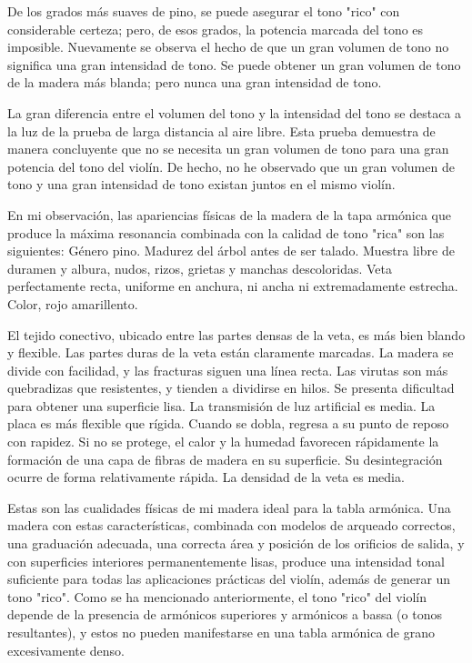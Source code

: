 \documentclass[12pt]{book}
\begin{document}
De los grados más suaves de pino, se puede asegurar el tono "rico" con considerable certeza; pero, de esos grados, la potencia marcada del tono es imposible. Nuevamente se observa el hecho de que un gran volumen de tono no significa una gran intensidad de tono. Se puede obtener un gran volumen de tono de la madera más blanda; pero nunca una gran intensidad de tono.

La gran diferencia entre el volumen del tono y la intensidad del tono se destaca a la luz de la prueba de larga distancia al aire libre. Esta prueba demuestra de manera concluyente que no se necesita un gran volumen de tono para una gran potencia del tono del violín. De hecho, no he observado que un gran volumen de tono y una gran intensidad de tono existan juntos en el mismo violín.

En mi observación, las apariencias físicas de la madera de la tapa armónica que produce la máxima resonancia combinada con la calidad de tono "rica" son las siguientes: Género pino. Madurez del árbol antes de ser talado. Muestra libre de duramen y albura, nudos, rizos, grietas y manchas descoloridas. Veta perfectamente recta, uniforme en anchura, ni ancha ni extremadamente estrecha. Color, rojo amarillento.

El tejido conectivo, ubicado entre las partes densas de la veta, es más bien blando y flexible.  
Las partes duras de la veta están claramente marcadas.  
La madera se divide con facilidad, y las fracturas siguen una línea recta.  
Las virutas son más quebradizas que resistentes, y tienden a dividirse en hilos.  
Se presenta dificultad para obtener una superficie lisa.  
La transmisión de luz artificial es media.  
La placa es más flexible que rígida.  
Cuando se dobla, regresa a su punto de reposo con rapidez.  
Si no se protege, el calor y la humedad favorecen rápidamente la formación de una capa de fibras de madera en su superficie.  
Su desintegración ocurre de forma relativamente rápida.  
La densidad de la veta es media.  

Estas son las cualidades físicas de mi madera ideal para la tabla armónica. Una madera con estas características, combinada con modelos de arqueado correctos, una graduación adecuada, una correcta área y posición de los orificios de salida, y con superficies interiores permanentemente lisas, produce una intensidad tonal suficiente para todas las aplicaciones prácticas del violín, además de generar un tono "rico". Como se ha mencionado anteriormente, el tono "rico" del violín depende de la presencia de armónicos superiores y armónicos a bassa (o tonos resultantes), y estos no pueden manifestarse en una tabla armónica de grano excesivamente denso.
\end{document}
